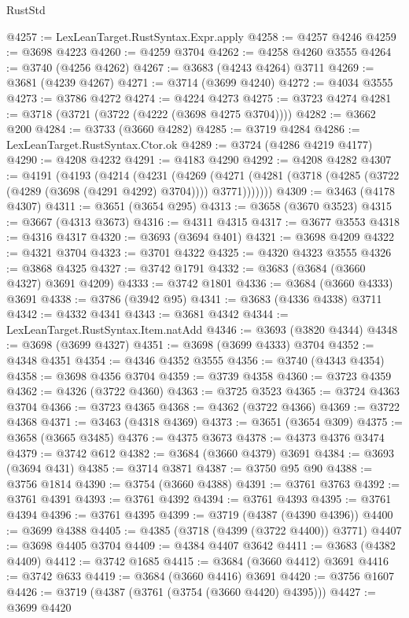 \begin{lexlean}{RustStd}
\begin{coremodule}
@4257 := LexLeanTarget.RustSyntax.Expr.apply
@4258 := @4257 @4246
@4259 := @3698 @4223
@4260 := @4259 @3704
@4262 := @4258 @4260 @3555
@4264 := @3740 (@4256 @4262)
@4267 := @3683 (@4243 @4264) @3711
@4269 := @3681 (@4239 @4267)
@4271 := @3714 (@3699 @4240)
@4272 := @4034 @3555
@4273 := @3786 @4272
@4274 := @4224 @4273
@4275 := @3723 @4274
@4281 := @3718 (@3721 (@3722 (@4222 (@3698 @4275 @3704))))
@4282 := @3662 @200
@4284 := @3733 (@3660 @4282)
@4285 := @3719 @4284
@4286 := LexLeanTarget.RustSyntax.Ctor.ok
@4289 := @3724 (@4286 @4219 @4177)
@4290 := @4208 @4232
@4291 := @4183 @4290
@4292 := @4208 @4282
@4307 := @4191
    (@4193
      (@4214
        (@4231
          (@4269
            (@4271 (@4281 (@3718 (@4285 (@3722 (@4289 (@3698 (@4291 @4292) @3704)))) @3771)))))))
@4309 := @3463 (@4178 @4307)
@4311 := @3651 (@3654 @295)
@4313 := @3658 (@3670 @3523)
@4315 := @3667 (@4313 @3673)
@4316 := @4311 @4315
@4317 := @3677 @3553
@4318 := @4316 @4317
@4320 := @3693 (@3694 @401)
@4321 := @3698 @4209
@4322 := @4321 @3704
@4323 := @3701 @4322
@4325 := @4320 @4323 @3555
@4326 := @3868 @4325
@4327 := @3742 @1791
@4332 := @3683 (@3684 (@3660 @4327) @3691 @4209)
@4333 := @3742 @1801
@4336 := @3684 (@3660 @4333) @3691
@4338 := @3786 (@3942 @95)
@4341 := @3683 (@4336 @4338) @3711
@4342 := @4332 @4341
@4343 := @3681 @4342
@4344 := LexLeanTarget.RustSyntax.Item.natAdd
@4346 := @3693 (@3820 @4344)
@4348 := @3698 (@3699 @4327)
@4351 := @3698 (@3699 @4333) @3704
@4352 := @4348 @4351
@4354 := @4346 @4352 @3555
@4356 := @3740 (@4343 @4354)
@4358 := @3698 @4356 @3704
@4359 := @3739 @4358
@4360 := @3723 @4359
@4362 := @4326 (@3722 @4360)
@4363 := @3725 @3523
@4365 := @3724 @4363 @3704
@4366 := @3723 @4365
@4368 := @4362 (@3722 @4366)
@4369 := @3722 @4368
@4371 := @3463 (@4318 @4369)
@4373 := @3651 (@3654 @309)
@4375 := @3658 (@3665 @3485)
@4376 := @4375 @3673
@4378 := @4373 @4376 @3474
@4379 := @3742 @612
@4382 := @3684 (@3660 @4379) @3691
@4384 := @3693 (@3694 @431)
@4385 := @3714 @3871
@4387 := @3750 @95 @90
@4388 := @3756 @1814
@4390 := @3754 (@3660 @4388)
@4391 := @3761 @3763
@4392 := @3761 @4391
@4393 := @3761 @4392
@4394 := @3761 @4393
@4395 := @3761 @4394
@4396 := @3761 @4395
@4399 := @3719 (@4387 (@4390 @4396))
@4400 := @3699 @4388
@4405 := @4385 (@3718 (@4399 (@3722 @4400)) @3771)
@4407 := @3698 @4405 @3704
@4409 := @4384 @4407 @3642
@4411 := @3683 (@4382 @4409)
@4412 := @3742 @1685
@4415 := @3684 (@3660 @4412) @3691
@4416 := @3742 @633
@4419 := @3684 (@3660 @4416) @3691
@4420 := @3756 @1607
@4426 := @3719 (@4387 (@3761 (@3754 (@3660 @4420) @4395)))
@4427 := @3699 @4420

\end{coremodule}
\end{lexlean}
